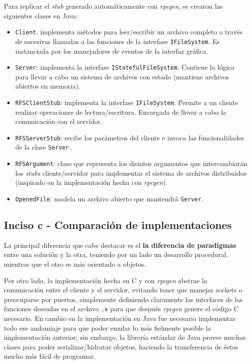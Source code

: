 Para replicar el \emph{stub} generado automáticamente con \emph{rpcgen}, se crearon las siguientes clases en Java:
\begin{itemize}
    \item \texttt{Client}: implementa métodos para leer/escribir un archivo completo a través de sucesivas llamadas a las funciones de la interfase \texttt{IFileSystem}. Es instanciada por los manejadores de eventos de la interfaz gráfica.
    \item \texttt{Server}: implementa la interfase \texttt{IStatefulFileSystem}. Contiene la lógica para llevar a cabo un sistema de archivos con estado (mantiene archivos abiertos en memoria).
    \item \texttt{RFSClientStub}: implementa la interfase \texttt{IFileSystem}. Permite a un cliente realizar operaciones de lectura/escritura. Encargada de llevar a cabo la comunicación con el servidor.
    \item \texttt{RFSServerStub}: recibe los parámetros del cliente e invoca las funcionalidades de la clase \texttt{Server}.
    \item \texttt{RFSArgument}: clase que representa los disintos argumentos que intercambiarán los \emph{stubs} cliente/servidor para implementar el sistema de archivos distribuidos (inspirado en la implementación hecha con \emph{rpcgen}).  
    \item \texttt{OpenedFile}: modela un archivo abierto que mantendrá \texttt{Server}.
\end{itemize}

\subsection{Inciso c - Comparación de implementaciones}

La principal diferencia que cabe destacar es el \textbf{la diferencia de paradigmas} entre una solución y la otra, teniendo por un lado un desarrollo procedural, mientras que el otro es más orientado a objetos.  

Por otro lado, la implementación hecha en C y con \emph{rpcgen} abstrae la comunicación entre el cliente y el servidor, evitando tener que manejar sockets o preocuparse por puertos, simplemente definiendo claramente las interfaces de las funciones deseadas en el archivo \texttt{.x} para que después \emph{rpcgen} genere el código C necesario. En cambio en la implementación en Java fue necesario implementar todo ese andamiaje para que poder emular lo más fielmente posible la implementación anterior; sin embargo, la librería estándar de Java provee muchas clases para poder serializar/hidratar objetos, haciendo la transferencia de éstos mucho más fácil de programar.

